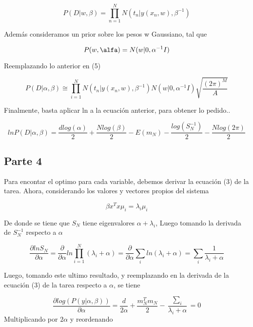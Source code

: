 \begin{equation*}
P(D|w,\beta)=\prod_{n=1}^{N}N(t_{n}|y(x_{n},w),\beta^{-1})
\end{equation*}


Además consideramos un prior sobre los pesos w Gaussiano, tal que 

\begin{equation}
P(w,\alfa)=N(w|0,\alpha^{-1}I)
\end{equation}

Reemplazando lo anterior en (5)

\begin{equation}
    P(D|\alpha,\beta)\cong \prod_{i=1}^{N}N(t_{n}|y(x_{n},w),\beta^{-1})N(w|0,\alpha^{-1}I)\sqrt{\frac{(2\pi)^{M}}{A}}
\end{equation}

Finalmente, basta aplicar ln a la ecuación anterior, para obtener lo pedido..


\begin{equation}
  ln  P(D|\alpha,\beta)=\frac{dlog(\alpha)}{2}+\frac{Nlog(\beta)}{2}-E(m_{N})-\frac{log(S_N^{-1})}{2}-\frac{Nlog(2\pi)}{2}
\end{equation}


\subsection{Parte 4}
Para encontar el optimo para cada variable, debemos derivar la ecuación (3) de la tarea. Ahora, considerando los valores y vectores propios del sistema 

\begin{equation}
    \beta x^{T}x\mu_{i}=\lambda_{i}\mu_{i}
\end{equation}

De donde se tiene que $S_{N}$ tiene eigenvalores $\alpha+\lambda_{i}$, Luego tomando la derivada de $S_{N}^{-1}$ respecto a $\alpha$

\begin{equation}
    \frac{\partial ln S_{N}}{\partial \alpha}=\frac{\partial }{\partial \alpha} ln \prod_{i=1}^{N}(\lambda_{i}+\alpha)=\frac{\partial }{\partial \alpha} \sum_{i}ln(\lambda_{i}+\alpha)=\sum_{i}\frac{1}{\lambda_{i}+\alpha}
\end{equation}

Luego, tomando este ultimo resultado, y reemplazando en la derivada de la ecuación (3) de la tarea respecto a $\alpha$, se tiene

\begin{equation}
    \frac{\partial  log(P(y|\alpha,\beta))}{\partial \alpha}= \frac{d}{2\alpha}+\frac{m_{N}^{T}m_{N}}{2}-\frac{\sum_{i}}{\lambda_{i}+\alpha}=0
\end{equation}
Multiplicando por $2\alpha$ y reordenando


